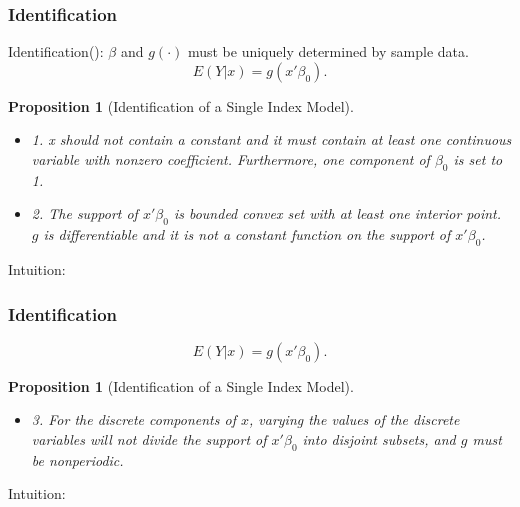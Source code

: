 \documentclass{beamer}
\begin{document}
\begin{frame}[t]
    \frametitle{Identification}
	  Identification(\citet{Horowitz09}): $\beta$ and $ g(\cdot)$ must be uniquely determined by sample data.
     \begin{equation}
		E(Y|x) = g(x'\beta_0).
	  \end{equation}
    \newtheorem{prop1}{Proposition}[section]   
	  \begin{prop1}[Identification of a Single Index Model] 
		
		\begin{itemize}
        \item 1. x should not contain a constant and it must contain at least one continuous variable with nonzero coefficient. Furthermore, one component of $\beta_0$ is set to 1.
        \item 2. The support of $x'\beta_0$ is bounded convex set with at least one interior point. $g$ is differentiable and it is not a constant function on the support of $x'\beta_0$.		
		\end{itemize}
    
    \end{prop1}
	Intuition:
\note{~}
\end{frame}


\begin{frame}[t]
    \frametitle{Identification}
     \begin{equation}
		E(Y|x) = g(x'\beta_0).
	  \end{equation}
    \newtheorem{prop2}{Proposition}[section]   
	  \begin{prop2}[Identification of a Single Index Model] 
		\begin{itemize}
		  \item 3. For the discrete components of $x$, varying the values of the discrete variables will not divide the support of $x'\beta_0$ into disjoint subsets, and $g$ must be nonperiodic.
		\end{itemize}
    \end{prop2}
    Intuition:

\note{~}
\end{frame}



\end{document}

